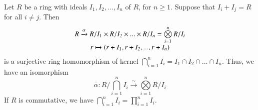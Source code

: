 \documentclass[12pt, a4paper, oneside, openright, titlepage]{book}
\begin{document}
\begin{cor}
    Let $R$ be a ring with ideals $I_1,I_2,...,I_n$ of $R$, for $n \geq 1$. Suppose that $I_i + I_j = R$ for all $i \neq j$. Then \begin{equation}
        \begin{array}{c} R\xrightarrow{\alpha} R/I_1 \times R/I_2 \times ... \times R/I_n = \bigotimes\limits_{i=1}^nR/I_i \\ r \mapsto (r+I_1, r+I_2,...,r+I_n) \end{array}
    \end{equation}
    is a surjective ring homomorphism of kernel $\bigcap\limits_{i=1}^n I_i =  I_1\cap I_2 \cap ... \cap I_n$. Thus, we have an isomorphism \begin{equation}
        \overline{\alpha}: R/\bigcap\limits_{i=1}^n I_i \xrightarrow{\sim} \bigotimes\limits_{i=1}^nR/I_i
    \end{equation}
    If $R$ is commutative, we have $\bigcap\limits_{i=1}^n I_i = \prod\limits_{i=1}^n I_i$.
\end{cor}
\end{document}

